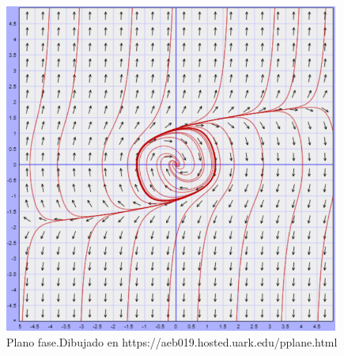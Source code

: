 \documentclass[12pt, a4paper]{report}
\begin{document}
\begin{figure}[h]
	\centering
	\includegraphics[width=11cm]{planorayleigh.png}
	\caption{Plano fase.Dibujado en https://aeb019.hosted.uark.edu/pplane.html}
\end{figure}

\newpage
\end{document}
